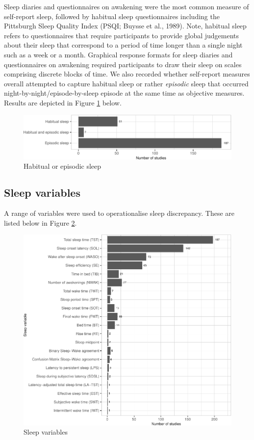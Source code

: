 \documentclass[
]{article}
\begin{document}
Sleep diaries and questionnaires on awakening were the most common measure of self-report sleep, followed by habitual sleep questionnaires including the Pittsburgh Sleep Quality Index (PSQI; Buysse et al., 1989). Note, habitual sleep refers to questionnaires that require participants to provide global judgements about their sleep that correspond to a period of time longer than a single night such as a week or a month. Graphical response formats for sleep diaries and questionnaires on awakening required participants to draw their sleep on scales comprising discrete blocks of time. We also recorded whether self-report measures overall attempted to capture habitual sleep or rather \emph{episodic} sleep that occurred night-by-night/episode-by-sleep episode at the same time as objective measures. Results are depicted in Figure \ref{fig:habitual} below.

\begin{figure}
\centering
\includegraphics{review_markdown_files/figure-latex/habitual-1.pdf}
\caption{\label{fig:habitual}Habitual or episodic sleep}
\end{figure}

\subsection{Sleep variables}\label{sleep-variables}

A range of variables were used to operationalise sleep discrepancy. These are listed below in Figure \ref{fig:vargraph}.

\begin{figure}
\centering
\includegraphics{review_markdown_files/figure-latex/vargraph-1.pdf}
\caption{\label{fig:vargraph}Sleep variables}
\end{figure}
\end{document}
